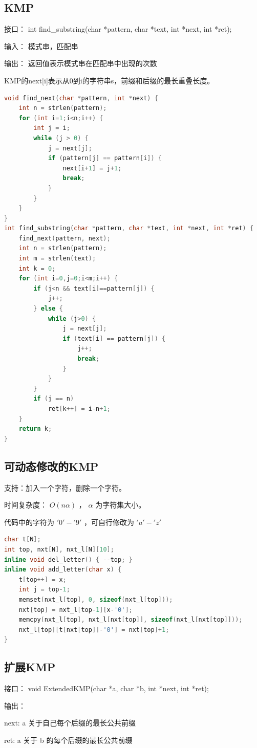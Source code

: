\documentclass{article}
\begin{document}
\subsection{KMP}
接口： int find\_substring(char *pattern, char *text, int *next, int *ret); 

输入： 模式串，匹配串 

输出： 返回值表示模式串在匹配串中出现的次数 

KMP的next[i]表示从0到i的字符串s，前缀和后缀的最长重叠长度。
\begin{lstlisting}[language=C++]
void find_next(char *pattern, int *next) {
	int n = strlen(pattern);
	for (int i=1;i<n;i++) {
		int j = i;
		while (j > 0) {
			j = next[j];
			if (pattern[j] == pattern[i]) {
				next[i+1] = j+1;
				break;
			}
		}
	}
}
int find_substring(char *pattern, char *text, int *next, int *ret) {
	find_next(pattern, next);
	int n = strlen(pattern);
	int m = strlen(text);
	int k = 0;
	for (int i=0,j=0;i<m;i++) {
		if (j<n && text[i]==pattern[j]) {
			j++;
		} else {
			while (j>0) {
				j = next[j];
				if (text[i] == pattern[j]) {
					j++;
					break;
				}
			}
		}
		if (j == n)
			ret[k++] = i-n+1;
	}
	return k;
}
\end{lstlisting}
\subsection{可动态修改的KMP}
支持：加入一个字符，删除一个字符。

时间复杂度： $O(n \alpha)$ ， $\alpha$ 为字符集大小。

代码中的字符为 $'0' - '9'$ ，可自行修改为 $'a' - 'z'$
\begin{lstlisting}[language=C++]
char t[N];
int top, nxt[N], nxt_l[N][10];
inline void del_letter() { --top; }
inline void add_letter(char x) {
	t[top++] = x;
	int j = top-1;
	memset(nxt_l[top], 0, sizeof(nxt_l[top]));
	nxt[top] = nxt_l[top-1][x-'0'];
	memcpy(nxt_l[top], nxt_l[nxt[top]], sizeof(nxt_l[nxt[top]]));
	nxt_l[top][t[nxt[top]]-'0'] = nxt[top]+1;
}
\end{lstlisting}
\subsection{扩展KMP}
接口： void ExtendedKMP(char *a, char *b, int *next, int *ret); 

输出： 

next:  a 关于自己每个后缀的最长公共前缀 

ret: a 关于 b 的每个后缀的最长公共前缀
\end{document}
